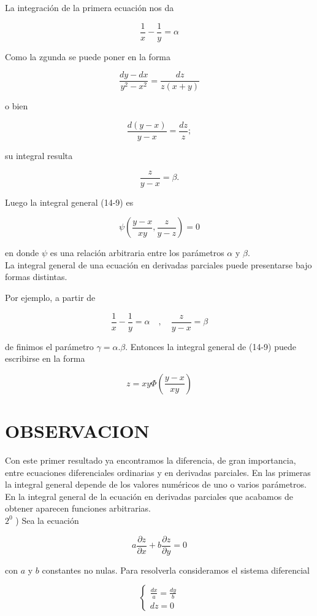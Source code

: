 \documentclass[10pt]{article}
\theoremstyle{plain}
\theoremstyle{definition}
\theoremstyle{remark}
\begin{document}
La integración de la primera ecuación nos da

$$
\frac{1}{x}-\frac{1}{y}=\alpha
$$

Como la zgunda se puede poner en la forma

$$
\frac{d y-d x}{y^{2}-x^{2}}=\frac{d z}{z(x+y)}
$$

o bien

$$
\frac{d(y-x)}{y-x}=\frac{d z}{z} ;
$$

su integral resulta

$$
\frac{z}{y-x}=\beta .
$$

Luego la integral general (14-9) es


\begin{equation*}
\psi\left(\frac{y-x}{x y}, \frac{z}{y-z}\right)=0 \tag{14-10}
\end{equation*}


en donde $\psi$ es una relación arbitraria entre los parámetros $\alpha$ y $\beta$.\\
La integral general de una ecuación en derivadas parciales puede presentarse bajo formas distintas.

Por ejemplo, a partir de


$$
\frac{1}{x}-\frac{1}{y}=\alpha \quad, \quad \frac{z}{y-x}=\beta
$$

de finimos el parámetro $\gamma=\alpha . \beta$. Entonces la integral general de (14-9) puede escribirse en la forma

$$
z=x y \Phi\left(\frac{y-x}{x y}\right)
$$

\section*{OBSERVACION}
Con este primer resultado ya encontramos la diferencia, de gran importancia, entre ecuaciones diferenciales ordinarias y en derivadas parciales. En las primeras la integral general depende de los valores numéricos de uno o varios parámetros. En la integral general de la ecuación en derivadas parciales que acabamos de obtener aparecen funciones arbitrarias.\\
$2^{0}$ ) Sea la ecuación

$$
a \frac{\partial z}{\partial x}+b \frac{\partial z}{\partial y}=0
$$

con $a$ y $b$ constantes no nulas. Para resolverla consideramos el sistema diferencial

$$
\left\{\begin{array}{l}
\frac{d x}{a}=\frac{d y}{b} \\
d z=0
\end{array}\right.
$$
\end{document}
